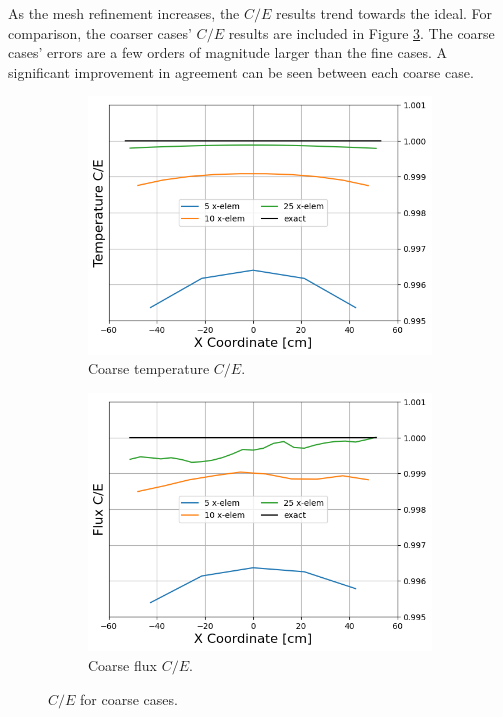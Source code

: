 \documentclass[letterpaper]{mc2023}
\begin{document}
As the mesh refinement increases, the $C/E$ results trend towards the ideal. For comparison, the coarser cases' $C/E$ results are
included in Figure \ref{fig:coarse_ce}. The coarse cases' errors are a few orders of magnitude larger than the fine cases. A significant
improvement in agreement can be seen between each coarse case.
\begin{figure}[H]
    \centering
    \begin{subfigure}{0.45\linewidth}
        \includegraphics[width=\linewidth]{figures/coarse_temp_num_to_analy_ratios.png}
        \caption{Coarse temperature $C/E$.}
        \label{fig:coarse_temp_ce}
    \end{subfigure}
    \begin{subfigure}{0.45\linewidth}
        \includegraphics[width=\linewidth]{figures/coarse_flux_num_to_analy_ratios.png}
        \caption{Coarse flux $C/E$.}
        \label{fig:coarse_flux_ce}
    \end{subfigure}
    \par\bigskip
    \caption{$C/E$ for coarse cases.}
    \label{fig:coarse_ce}
\end{figure}
\end{document}
